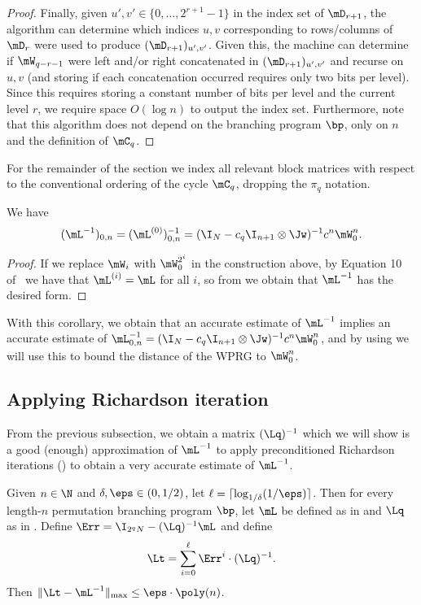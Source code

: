 \begin{proof}
Finally, given $u',v' \in \{0,\ldots,2^{r+1}-1\}$ in the index set of $\mD_{r+1}$, the algorithm can determine which indices $u,v$ corresponding to rows/columns of $\mD_{r}$ were used to produce $(\mD_{r+1})_{u',v'}$. Given this, the machine can determine if $\mW_{q-r-1}$ were left and/or right concatenated in $(\mD_{r+1})_{u',v'}$ and recurse on $u,v$ (and storing if each concatenation occurred requires only two bits per level). Since this requires storing a constant number of bits per level and the current level $r$, we require space $O(\log n)$ to output the index set. Furthermore, note that this algorithm does not depend on the branching program $\bp$, only on $n$ and the definition of $\mC_q$.
\end{proof}
For the remainder of the section we index all relevant block matrices with respect to the conventional ordering of the cycle $\mC_q$, dropping the $\pi_q$ notation.  
\begin{corollary}\label{cor:trueCycleInverse}
We have
$$(\mL^{-1})_{0,n}=(\mL^{(0)})^{-1}_{0,n} = (\I_N-c_q\I_{n+1}\otimes\Jw)^{-1}c^n\mW_0^n.$$
\end{corollary}
\begin{proof}
  If we replace $\mW_i$ with $\mW_0^{2^i}$ in the construction above, by Equation 10 of~\cite{AhmadinejadKeMuPeSiVa19} we have that $\mL^{(i)}=\mL$ for all $i$, so from
%
we obtain that $\mL^{-1}$ has the desired form.
\end{proof}
With this corollary, we obtain that an accurate estimate of $\mL^{-1}$ implies an accurate estimate of $\mL^{-1}_{0,n}=(\I_N-c_q\I_{n+1}\otimes\Jw)^{-1}c^n\mW_0^n$, and by using  we will use this to bound the distance of the WPRG to $\mW_0^n$.

\subsection{Applying Richardson iteration}
From the previous subsection, we obtain a matrix $(\Lq)^{-1}$ which we will show is a good (enough) approximation of $\mL^{-1}$ to apply preconditioned Richardson iterations () to obtain a very accurate estimate of $\mL^{-1}$.

\begin{proposition}\label{prop:cycleEntrywise}
Given $n\in \N$ and $\delta,\eps \in (0,1/2)$, let $\ell=\lceil \log_{1/\delta}(1/\eps)\rceil$. Then for every length-$n$ permutation branching program $\bp$, let $\mL$ be defined as in  and $\Lq$ as in . Define $\Err = \I_{2^qN}-(\Lq)^{-1}\mL$ and define
$$\Lt=\sum_{i=0}^\ell \Err^i\cdot (\Lq)^{-1}.$$
Then $\|\Lt - \mL^{-1}\|_{\max}\leq \eps \cdot \poly(n)$.
\end{proposition}


